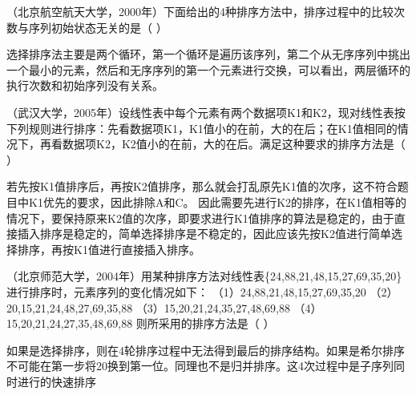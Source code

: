 \question （北京航空航天大学，2000年）下面给出的4种排序方法中，排序过程中的比较次数与序列初始状态无关的是（
）
\par{}
\begin{solution}选择排序法主要是两个循环，第一个循环是遍历该序列，第二个从无序序列中挑出一个最小的元素，然后和无序序列的第一个元素进行交换，可以看出，两层循环的执行次数和初始序列没有关系。
\end{solution}
\question （武汉大学，2005年）设线性表中每个元素有两个数据项K1和K2，现对线性表按下列规则进行排序：先看数据项K1，K1值小的在前，大的在后；在K1值相同的情况下，再看数据项K2，K2值小的在前，大的在后。满足这种要求的排序方法是（
）
\par{}
\begin{solution}若先按K1值排序后，再按K2值排序，那么就会打乱原先K1值的次序，这不符合题目中K1优先的要求，因此排除A和C。
因此需要先进行K2的排序，在K1值相等的情况下，要保持原来K2值的次序，即要求进行K1值排序的算法是稳定的，由于直接插入排序是稳定的，简单选择排序是不稳定的，因此应该先按K2值进行简单选择排序，再按K1值进行直接插入排序。
\end{solution}
\question （北京师范大学，2004年）用某种排序方法对线性表\{24,88,21,48,15,27,69,35,20\}进行排序时，元素序列的变化情况如下：
（1）24,88,21,48,15,27,69,35,20 （2）20,15,21,24,48,27,69,35,88
（3）15,20,21,24,35,27,48,69,88 （4）15,20,21,24,27,35,48,69,88
则所采用的排序方法是（ ）
\par{}
\begin{solution}如果是选择排序，则在4轮排序过程中无法得到最后的排序结构。如果是希尔排序不可能在第一步将20换到第一位。同理也不是归并排序。这4次过程中是子序列同时进行的快速排序
\end{solution}
